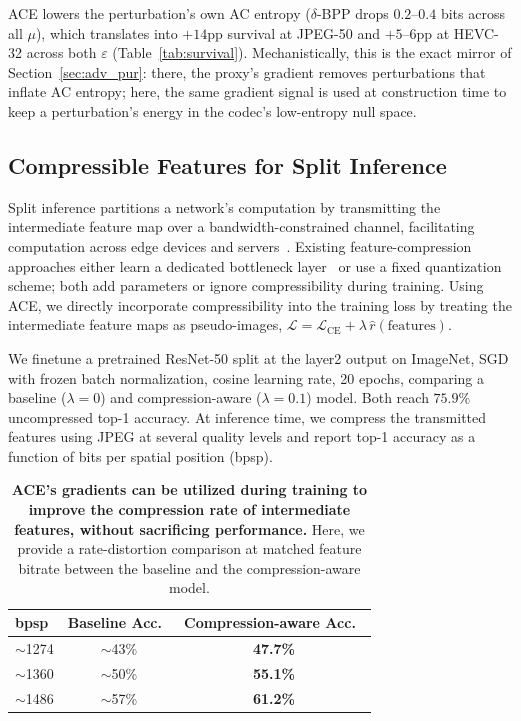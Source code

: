 \documentclass{article}
\theoremstyle{definition}
\begin{document}
ACE lowers the perturbation's own AC entropy ($\delta$-BPP drops $0.2$--$0.4$ bits across all $\mu$), which translates into $+14$pp survival at JPEG-50 and $+5$--$6$pp at HEVC-32 across both $\varepsilon$ (Table~\ref{tab:survival}).
Mechanistically, this is the exact mirror of Section~\ref{sec:adv_pur}: there, the proxy's gradient removes perturbations that inflate AC entropy; here, the same gradient signal is used at construction time to keep a perturbation's energy in the codec's low-entropy null space.

\subsection{Compressible Features for Split Inference}
\label{sec:split}

Split inference partitions a network's computation by transmitting the intermediate feature map over a bandwidth-constrained channel, facilitating computation across edge devices and servers~\citep{kang2017neurosurgeon}.
Existing feature-compression approaches either learn a dedicated bottleneck layer~\citep{shi2019bottlenet} or use a fixed quantization scheme; both add parameters or ignore compressibility during training.
Using ACE, we directly incorporate compressibility into the training loss by treating the intermediate feature maps as pseudo-images, $\mathcal{L} = \mathcal{L}_{\text{CE}} + \lambda\,\hat{r}(\text{features})$.

We finetune a pretrained ResNet-50 split at the layer2 output on ImageNet, SGD with frozen batch normalization, cosine learning rate, 20 epochs, comparing a baseline ($\lambda=0$) and compression-aware ($\lambda=0.1$) model.
Both reach $75.9\%$ uncompressed top-1 accuracy.
At inference time, we compress the transmitted features using JPEG at several quality levels and report top-1 accuracy as a function of bits per spatial position (bpsp).

\begin{table}[h]
  \centering
  \small
  \caption{
  \textbf{ACE's gradients can be utilized during training to improve the compression rate of intermediate features, without sacrificing performance.}
  Here, we provide a rate-distortion comparison at matched feature bitrate between the baseline and the compression-aware model.
  }
  \label{tab:split}
  \begin{tabular}{lcc}
    \toprule
    bpsp & Baseline Acc.\ & Compression-aware Acc.\ \\
    \midrule
    $\sim$1274 & $\sim$43\% & \textbf{47.7\%} \\
    $\sim$1360 & $\sim$50\% & \textbf{55.1\%} \\
    $\sim$1486 & $\sim$57\% & \textbf{61.2\%} \\
    \bottomrule
  \end{tabular}
\end{table}
\end{document}
